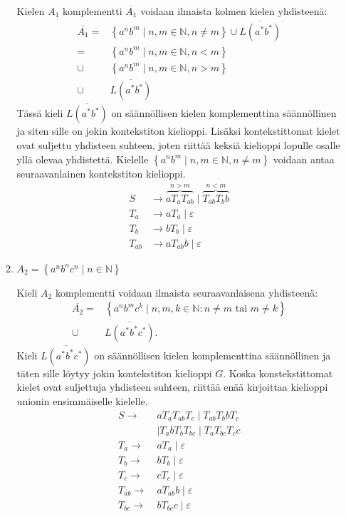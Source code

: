 \documentclass[a4paper,11pt]{article}
\newcommand{\set}[1]{{\left\{ #1 \right\}}}
\newcommand{\Nat}{\mathbb{N}}
\begin{document}
\begin{enumerate}
\begin{enumerate}
    Kielen $A_1$ komplementti $\overline{A_1}$ voidaan ilmaista kolmen
    kielen yhdisteenä:
    \begin{align*}
      \overline{A_1}
      =    & \set{a^nb^m \mid n,m \in \Nat, n \neq m}
             \cup \overline{L(a^*b^*)}\\
      =    & \set{a^nb^m \mid n,m \in \Nat, n < m} \\
      \cup & \set{a^nb^m \mid n,m \in \Nat, n > m} \\
      \cup & \overline{L(a^*b^*)}
    \end{align*}
    Tässä kieli $\overline{L(a^*b^*)}$ on säännöllisen kielen komplementtina
    säännöllinen ja siten sille on jokin kontekstiton kielioppi. Lisäksi
    kontekstittomat kielet ovat suljettu yhdisteen suhteen, joten riittää
    keksiä kielioppi lopulle osalle yllä olevaa yhdistettä. Kielelle
    $\set{a^nb^m \mid n,m \in \Nat, n \neq m}$ voidaan antaa seuraavanlainen
    kontekstiton kielioppi.
    \begin{align*}
      S      & \to \overbrace{aT_aT_{ab}}^{n > m} \mid \overbrace{T_{ab} T_b b}^{n < m} \\
      T_a    & \to aT_a       \mid \varepsilon  \\
      T_b    & \to bT_b       \mid \varepsilon  \\
      T_{ab} & \to aT_{ab}b   \mid \varepsilon
    \end{align*}

  \item
    $A_2 = \set{a^n b^n c^n \mid n \in \Nat}$

    Kieli $A_2$ komplementti voidaan ilmaista seuraavanlaisena
    yhdisteenä:
    \begin{align*}
      \overline{A_2}
         = & \set{a^nb^mc^k \mid n,m,k \in \Nat : n \neq m \text{ tai }
                                                  m \neq k} \\
      \cup & \overline{L(a^*b^*c^*)} \text{.}
    \end{align*}
    Kieli $\overline{L(a^*b^*c^*)}$ on säännöllisen kielen komplementtina
    säännöllinen ja täten sille löytyy jokin kontekstiton kielioppi $G$. Koska
    konstekstittomat kielet ovat suljettuja yhdisteen suhteen, riittää enää
    kirjoittaa kielioppi unionin ensimmäiselle kielelle.
    \begin{align*}
      S \to\      & aT_aT_{ab}T_c \mid T_{ab}T_bbT_c \\
                  & \mid T_abT_{b}T_{bc} \mid T_aT_{bc}T_cc \\
      T_a \to\    & aT_a \mid \varepsilon \\
      T_b \to\    & bT_b \mid \varepsilon \\
      T_c \to\    & cT_c \mid \varepsilon \\
      T_{ab} \to\ & aT_{ab}b \mid \varepsilon \\
      T_{bc} \to\ & bT_{bc}c \mid \varepsilon
    \end{align*}
  \end{enumerate}
\end{enumerate}
\end{document}
